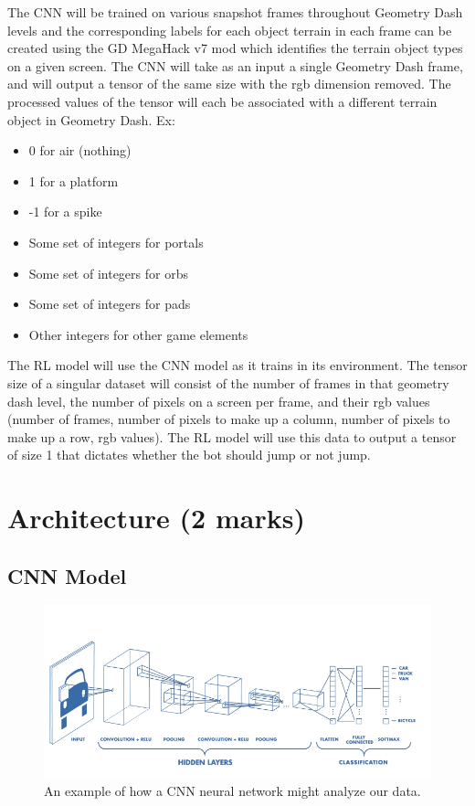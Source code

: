 \documentclass{article} %
\begin{document}
The CNN will be trained on various snapshot frames throughout Geometry Dash 
levels and the corresponding labels for each object terrain in each frame can 
be created using the GD MegaHack v7 mod which identifies the terrain object 
types on a given screen. The CNN will take as an input a single Geometry Dash 
frame, and will output a tensor of the same size with the rgb dimension removed. 
The processed values of the tensor will each be associated with a different 
terrain object in Geometry Dash. Ex: 
\begin{itemize}
\item 0 for air (nothing)
\item 1 for a platform
\item -1 for a spike
\item Some set of integers for portals
\item Some set of integers for orbs
\item Some set of integers for pads
\item Other integers for other game elements
\end{itemize}
The RL model will use the CNN model as it trains in its environment. The tensor 
size of a singular dataset will consist of the number of frames in that geometry 
dash level, the number of pixels on a screen per frame, and their rgb values (number of frames, number 
of pixels to make up a column, number of pixels to make up a row, rgb values). 
The RL model will use this data to output a tensor of size 1 that dictates 
whether 
the bot should jump or not jump. 


\section{Architecture (2 marks)}

\subsection{CNN Model}

\begin{figure}[!htbp]
\begin{center}
\includegraphics[width=1.0\textwidth]{Figs/CNN_sample_structure.png}
\end{center}
\caption{An example of how a CNN neural network might analyze our data.}
\label{fig:CNN_neural_network}
\end{figure}
\end{document}
